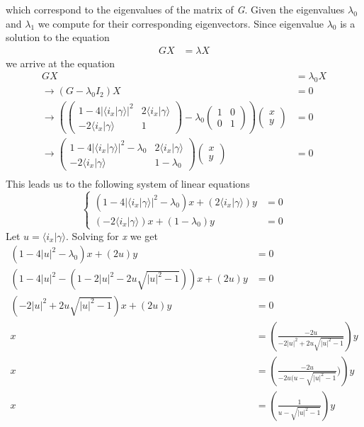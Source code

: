 which correspond to the eigenvalues of the matrix of \textit{G}. Given the eigenvalues $\lambda_0$ and $\lambda_1$ we compute for their corresponding eigenvectors. Since eigenvalue $\lambda_0$ is a solution to the equation
\begin{align}
GX &= \lambda X
\end{align}
we arrive at the equation
\begin{align}
GX &= \lambda_0 X\\
\rightarrow (G - \lambda_0 I_2)X &= 0\\
\rightarrow
\left(
\begin{pmatrix}
1-4\left\vert\langle i_{x} \vert \gamma \rangle\right\vert^{2} & 2\langle i_{x} \vert \gamma \rangle\\
-2\langle i_{x} \vert \gamma \rangle & 1
\end{pmatrix}
-
\lambda_0
\begin{pmatrix}
1 & 0\\
0 & 1
\end{pmatrix}
\right)
\begin{pmatrix}
x\\
y
\end{pmatrix}
&= 0\\
\rightarrow
\begin{pmatrix}
1-4\left\vert\langle i_{x} \vert \gamma \rangle\right\vert^{2} - \lambda_0 & 2\langle i_{x} \vert \gamma \rangle\\
-2\langle i_{x} \vert \gamma \rangle & 1 - \lambda_0
\end{pmatrix}
\begin{pmatrix}
x\\
y
\end{pmatrix}
&= 0\\
\end{align}
This leads us to the following system of linear equations
\[
\begin{cases}
\left(1-4\left\vert\langle i_{x} \vert \gamma \rangle\right\vert^{2} - \lambda_0\right) x + \left(2\langle i_{x} \vert \gamma \rangle\right) y & = 0\\
\left(-2\langle i_{x} \vert \gamma \rangle\right)x + \left(1 - \lambda_0\right)y &= 0
\end{cases}
\]
Let $u = \langle i_{x} \vert \gamma \rangle$. Solving for \textit{x} we get
\begin{align}
\left(1-4\left\vert u \right\vert^{2} - \lambda_0\right) x + \left(2u\right) y & = 0\\
\left(1-4\left\vert u \right\vert^{2} - \left(1 - 2\left\vert u \right\vert^{2} - 2u \sqrt{\left\vert u \right\vert^{2} - 1} \right) \right)x + \left(2u\right) y & = 0\\
\left( -2\left\vert u \right\vert^{2} + 2u \sqrt{\left\vert u \right\vert^{2} - 1}\right)x + \left( 2u \right) y & = 0\\
x &= \left(\frac{-2u}{-2\left\vert u \right\vert^{2} + 2u \sqrt{\left\vert u \right\vert^{2} - 1}}\right) y\\
x &= \left(\frac{-2u}{-2u(u - \sqrt{\left\vert u \right\vert^{2} - 1}})\right) y\\
x &= \left(\frac{1}{u - \sqrt{\left\vert u \right\vert^{2} - 1}}\right)y
\end{align}
